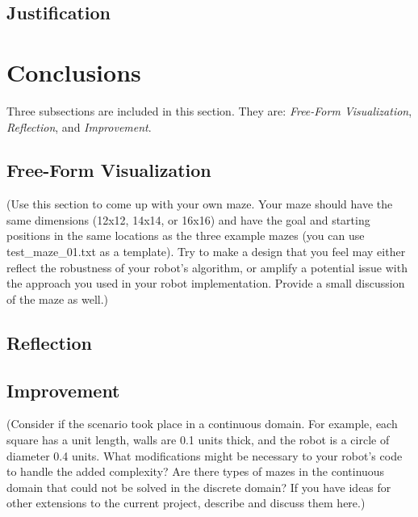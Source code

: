 \documentclass[11pt, oneside]{article}   	%
\begin{document}
\subsection{Justification}


\section{Conclusions}
Three subsections are included in this section. They are: {\it Free-Form Visualization}, {\it Reflection}, and {\it Improvement}.
\subsection{Free-Form Visualization}
(Use this section to come up with your own maze. Your maze should have the same dimensions (12x12, 14x14, or 16x16) and have the goal and starting positions in the same locations as the three example mazes (you can use test\_maze\_01.txt as a template). Try to make a design that you feel may either reflect the robustness of your robot's algorithm, or amplify a potential issue with the approach you used in your robot implementation. Provide a small discussion of the maze as well.)
\subsection{Reflection}
\subsection{Improvement}
(Consider if the scenario took place in a continuous domain. For example, each square has a unit length, walls are 0.1 units thick, and the robot is a circle of diameter 0.4 units. What modifications might be necessary to your robot’s code to handle the added complexity? Are there types of mazes in the continuous domain that could not be solved in the discrete domain? If you have ideas for other extensions to the current project, describe and discuss them here.)
\end{document}
